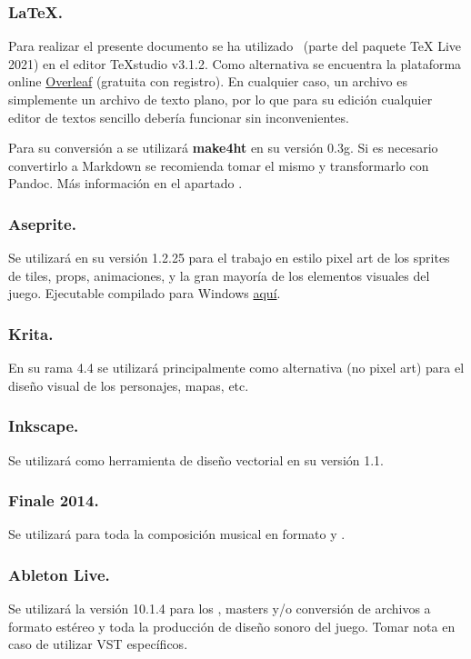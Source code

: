 \subsubsection{LaTeX.}
Para realizar el presente documento se ha utilizado \LaTeXe\ (parte del paquete TeX Live 2021) en el editor TeXstudio v3.1.2. Como alternativa se encuentra la plataforma online \href{https://www.overleaf.com/}{Overleaf} (gratuita con registro). En cualquier caso, un archivo  es simplemente un archivo de texto plano, por lo que para su edición cualquier editor de textos sencillo debería funcionar sin inconvenientes.

Para su conversión a  se utilizará \textbf{make4ht} en su versión 0.3g. Si es necesario convertirlo a Markdown se recomienda tomar el mismo  y transformarlo con Pandoc. Más información en el apartado .

\subsubsection{Aseprite.}
Se utilizará en su versión 1.2.25 para el trabajo en estilo pixel art de los sprites de tiles, props, animaciones,  y la gran mayoría de los elementos visuales del juego. Ejecutable compilado para Windows \href{https://drive.google.com/drive/folders/1DPhGeg7WzV9j81u3B5isgsXqoMtfd_Uv?usp=sharing}{aquí}.

\subsubsection{Krita.}
En su rama 4.4 se utilizará principalmente como alternativa (no pixel art) para el diseño visual de los personajes, mapas, etc.

\subsubsection{Inkscape.}
Se utilizará como herramienta de diseño vectorial en su versión 1.1.

\subsubsection{Finale 2014.}
Se utilizará para toda la composición musical en formato  y .

\subsubsection{Ableton Live.}
Se utilizará la versión 10.1.4 para los , masters y/o conversión de archivos  a formato  estéreo y toda la producción de diseño sonoro del juego. Tomar nota en caso de utilizar VST específicos.

